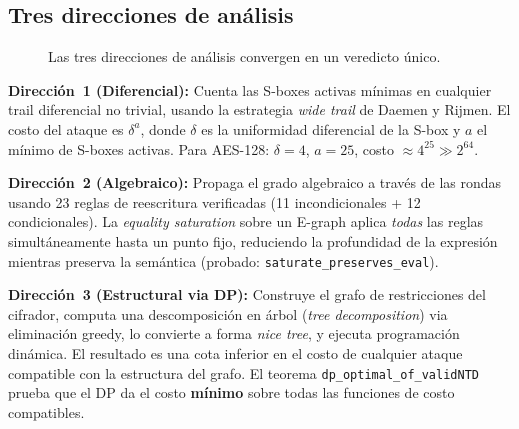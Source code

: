 \documentclass[11pt,a4paper]{article}
\begin{document}
\subsection{Tres direcciones de análisis}

\begin{figure}[h]
\centering
{}
\caption{Las tres direcciones de análisis convergen en un veredicto único.}
\end{figure}

\textbf{Dirección~1 (Diferencial):} Cuenta las S-boxes activas mínimas en cualquier trail diferencial no trivial, usando la estrategia \emph{wide trail} de Daemen y Rijmen. El costo del ataque es $\delta^{a}$, donde $\delta$ es la uniformidad diferencial de la S-box y $a$ el mínimo de S-boxes activas. Para AES-128: $\delta=4$, $a=25$, costo $\approx 4^{25} \gg 2^{64}$.

\textbf{Dirección~2 (Algebraico):} Propaga el grado algebraico a través de las rondas usando 23 reglas de reescritura verificadas (11 incondicionales + 12 condicionales). La \emph{equality saturation} sobre un E-graph aplica \emph{todas} las reglas simultáneamente hasta un punto fijo, reduciendo la profundidad de la expresión mientras preserva la semántica (probado: \texttt{saturate\_preserves\_eval}).

\textbf{Dirección~3 (Estructural via DP):} Construye el grafo de restricciones del cifrador, computa una descomposición en árbol (\emph{tree decomposition}) via eliminación greedy, lo convierte a forma \emph{nice tree}, y ejecuta programación dinámica. El resultado es una cota inferior en el costo de cualquier ataque compatible con la estructura del grafo. El teorema \texttt{dp\_optimal\_of\_validNTD} prueba que el DP da el costo \textbf{mínimo} sobre todas las funciones de costo compatibles.
\end{document}
